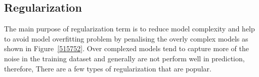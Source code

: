 \subsection{Regularization}

The main purpose of regularization term is to reduce model complexity and help to avoid model overfitting problem by penalising the overly complex models as shown in Figure~\ref{515752}. Over complexed models tend to capture more of the noise in the training dataset and generally are not perform well in prediction, therefore, There are a few types of regularization that are popular. 